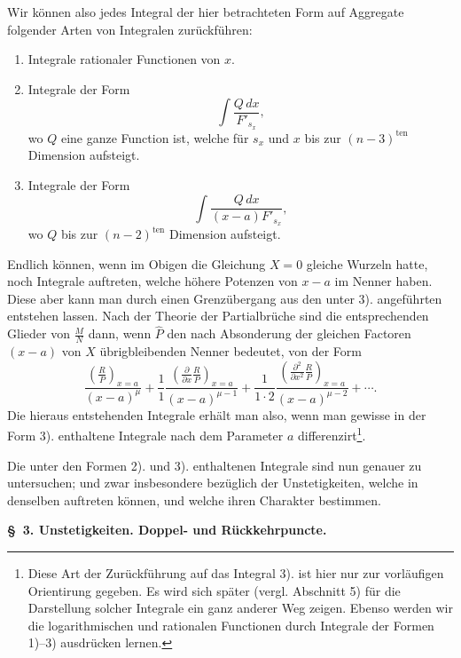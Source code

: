 \documentclass[10pt]{article}
\begin{document}
Wir können also jedes Integral der hier betrachteten Form auf Aggregate folgender Arten von Integralen zurückführen:
\begin{enumerate}
\item Integrale rationaler Functionen von $x$.
\item Integrale der Form
\[
\int\frac{Q\,dx}{F'_{s_x}},
\]
wo $Q$ eine ganze Function ist, welche für $s_x$ und $x$ bis zur $(n-3)^{\mathrm{ten}}$ Dimension aufsteigt.
\item Integrale der Form
\[
\int\frac{Q\,dx}{(x-a)F'_{s_x}},
\]
wo $Q$ bis zur $(n-2)^{\mathrm{ten}}$ Dimension aufsteigt.
\end{enumerate}
Endlich können, wenn im Obigen die Gleichung $X=0$ gleiche Wurzeln hatte, noch Integrale auftreten, welche höhere Potenzen von $x-a$ im Nenner haben. Diese aber kann man durch einen Grenzübergang aus den unter 3). angeführten entstehen lassen. Nach der Theorie der Partialbrüche sind die entsprechenden Glieder von $\frac{M}{N}$ dann, wenn $\hat P$ den nach Absonderung der gleichen Factoren $(x-a)$ von $X$ übrigbleibenden Nenner bedeutet, von der Form
\[
\frac{\left(\frac{R}{P}\right)_{x=a}}{(x-a)^\mu}
+\frac{1}{1}\frac{\left(\frac{\partial}{\partial x}\frac{R}{P}\right)_{x=a}}{(x-a)^{\mu-1}}
+\frac{1}{1\cdot2}\frac{\left(\frac{\partial^2}{\partial x^2}\frac{R}{P}\right)_{x=a}}{(x-a)^{\mu-2}}+\cdots.
\]
Die hieraus entstehenden Integrale erhält man also, wenn man gewisse in der Form 3). enthaltene Integrale nach dem Parameter $a$ differenzirt\footnote{Diese Art der Zurückführung auf das Integral 3). ist hier nur zur vorläufigen Orientirung gegeben. Es wird sich später (vergl. Abschnitt 5) für die Darstellung solcher Integrale ein ganz anderer Weg zeigen. Ebenso werden wir die logarithmischen und rationalen Functionen durch Integrale der Formen 1)--3) ausdrücken lernen.}.

Die unter den Formen 2). und 3). enthaltenen Integrale sind nun genauer zu untersuchen; und zwar insbesondere bezüglich der Unstetigkeiten, welche in denselben auftreten können, und welche ihren Charakter bestimmen.

\begin{center}
{\bfseries \S\ 3. Unstetigkeiten. Doppel- und Rückkehrpuncte.}
\end{center}
\end{document}

